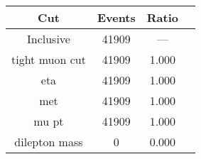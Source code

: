 \begin{tabular}{|c||c|c|c|}
\hline
Cut & Events & Ratio\\\hline
Inclusive & 41909 & — \\
tight muon cut & 41909 & 1.000 \\
eta & 41909 & 1.000 \\
met & 41909 & 1.000 \\
mu pt & 41909 & 1.000 \\
dilepton mass & 0 & 0.000 \\
\hline
\end{tabular}
